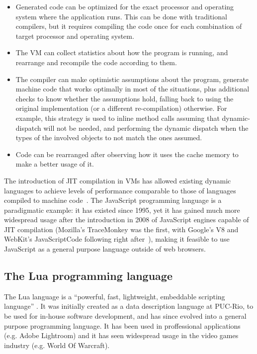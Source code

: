 \begin{itemize}

	\item Generated code can be optimized for the exact processor and operating
	system where the application runs. This can be done with traditional
	compilers, but it requires compiling the code once for each combination of
	target processor and operating system.

	\item The VM can collect statistics about how the program is running, and
	rearrange and recompile the code according to them.

	\item The compiler can make optimistic assumptions about the program,
	generate machine code that works optimally in most of the situations, plus
	additional checks to know whether the assumptions hold, falling back to
	using the original implementation (or a different re-compilation) otherwise.
	For example, this strategy is used to inline method calls assuming that
	\gls{dynamic-dispatch} will not be needed, and performing the dynamic
	dispatch when the types of the involved objects to not match the ones assumed.

	\item Code can be rearranged after observing how it uses the cache memory to
	make a better usage of it.

\end{itemize}

The introduction of JIT compilation in VMs has allowed existing dynamic
languages to achieve levels of performance comparable to those of languages
compiled to machine code~\cite{lj-perf1}. The JavaScript programming language
is a paradigmatic example: it has existed since 1995, yet it has gained much
more widespread usage after the introduction in 2008 of JavaScript engines
capable of JIT compilation (Mozilla's TraceMonkey was the first, with Google's
V8 and WebKit's JavaScriptCode following right after~\cite{js-raceforspeed}),
making it feasible to use JavaScript as a general purpose language outside of
web browsers.


\subsection{The Lua programming language}
	\label{sec:lua-programming-lang}

The Lua language is a “powerful, fast, lightweight, embeddable scripting
language” \cite{lua-about}. It was initially created as a data description
language at \gls{PUC-Rio}, to be used for in-house software development, and
has since evolved into a general purpose programming language. It has been
used in proffessional applications (e.g. Adobe Lightroom) and it has seen
widespread usage in the video games industry (e.g. World Of Warcraft).

